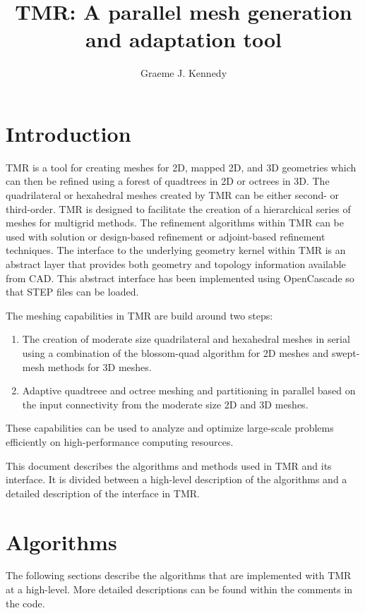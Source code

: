 \documentclass[12pt]{article}
\title{TMR: A parallel mesh generation and adaptation tool}
\author{Graeme J. Kennedy}
\date{}
\begin{document}
\maketitle

\section{Introduction}

TMR is a tool for creating meshes for 2D, mapped 2D, and 3D geometries which can then be refined using a forest of quadtrees in 2D or octrees in 3D.
The quadrilateral or hexahedral meshes created by TMR can be either second- or third-order.
TMR is designed to facilitate the creation of a hierarchical series of meshes for multigrid methods.
The refinement algorithms within TMR can be used with solution or design-based refinement or adjoint-based refinement techniques.
The interface to the underlying geometry kernel within TMR is an abstract layer that provides both geometry and topology information available from CAD.
This abstract interface has been implemented using OpenCascade so that STEP files can be loaded.

The meshing capabilities in TMR are build around two steps:
%
\begin{enumerate}
\item The creation of moderate size quadrilateral and hexahedral meshes in serial using a combination of the blossom-quad algorithm for 2D meshes and swept-mesh methods for 3D meshes.
\item Adaptive quadtreee and octree meshing and partitioning in parallel based on the input connectivity from the moderate size 2D and 3D meshes.
\end{enumerate}
%
These capabilities can be used to analyze and optimize large-scale problems efficiently on high-performance computing resources. 

This document describes the algorithms and methods used in TMR and its interface.
It is divided between a high-level description of the algorithms and a detailed description of the interface in TMR.

\section{Algorithms}

The following sections describe the algorithms that are implemented with TMR at a high-level.
More detailed descriptions can be found within the comments in the code.
\end{document}
